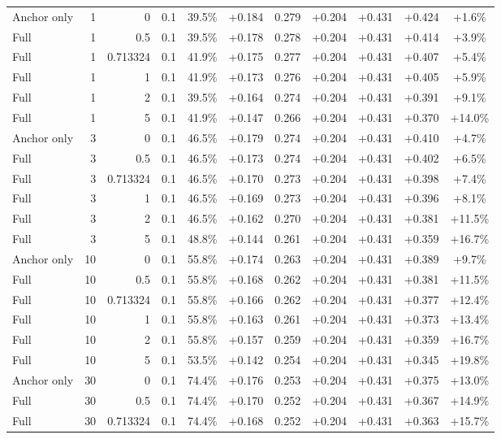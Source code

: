 \begin{table}[htbp]
\begin{tabular}{lrrrccccccc}
Anchor only & 1 & 0 & 0.1 & 39.5\% & +0.184 & 0.279 & +0.204 & +0.431 & +0.424 & +1.6\% \\
Full & 1 & 0.5 & 0.1 & 39.5\% & +0.178 & 0.278 & +0.204 & +0.431 & +0.414 & +3.9\% \\
Full & 1 & 0.713324 & 0.1 & 41.9\% & +0.175 & 0.277 & +0.204 & +0.431 & +0.407 & +5.4\% \\
Full & 1 & 1 & 0.1 & 41.9\% & +0.173 & 0.276 & +0.204 & +0.431 & +0.405 & +5.9\% \\
Full & 1 & 2 & 0.1 & 39.5\% & +0.164 & 0.274 & +0.204 & +0.431 & +0.391 & +9.1\% \\
Full & 1 & 5 & 0.1 & 41.9\% & +0.147 & 0.266 & +0.204 & +0.431 & +0.370 & +14.0\% \\
Anchor only & 3 & 0 & 0.1 & 46.5\% & +0.179 & 0.274 & +0.204 & +0.431 & +0.410 & +4.7\% \\
Full & 3 & 0.5 & 0.1 & 46.5\% & +0.173 & 0.274 & +0.204 & +0.431 & +0.402 & +6.5\% \\
Full & 3 & 0.713324 & 0.1 & 46.5\% & +0.170 & 0.273 & +0.204 & +0.431 & +0.398 & +7.4\% \\
Full & 3 & 1 & 0.1 & 46.5\% & +0.169 & 0.273 & +0.204 & +0.431 & +0.396 & +8.1\% \\
Full & 3 & 2 & 0.1 & 46.5\% & +0.162 & 0.270 & +0.204 & +0.431 & +0.381 & +11.5\% \\
Full & 3 & 5 & 0.1 & 48.8\% & +0.144 & 0.261 & +0.204 & +0.431 & +0.359 & +16.7\% \\
Anchor only & 10 & 0 & 0.1 & 55.8\% & +0.174 & 0.263 & +0.204 & +0.431 & +0.389 & +9.7\% \\
Full & 10 & 0.5 & 0.1 & 55.8\% & +0.168 & 0.262 & +0.204 & +0.431 & +0.381 & +11.5\% \\
Full & 10 & 0.713324 & 0.1 & 55.8\% & +0.166 & 0.262 & +0.204 & +0.431 & +0.377 & +12.4\% \\
Full & 10 & 1 & 0.1 & 55.8\% & +0.163 & 0.261 & +0.204 & +0.431 & +0.373 & +13.4\% \\
Full & 10 & 2 & 0.1 & 55.8\% & +0.157 & 0.259 & +0.204 & +0.431 & +0.359 & +16.7\% \\
Full & 10 & 5 & 0.1 & 53.5\% & +0.142 & 0.254 & +0.204 & +0.431 & +0.345 & +19.8\% \\
Anchor only & 30 & 0 & 0.1 & 74.4\% & +0.176 & 0.253 & +0.204 & +0.431 & +0.375 & +13.0\% \\
Full & 30 & 0.5 & 0.1 & 74.4\% & +0.170 & 0.252 & +0.204 & +0.431 & +0.367 & +14.9\% \\
Full & 30 & 0.713324 & 0.1 & 74.4\% & +0.168 & 0.252 & +0.204 & +0.431 & +0.363 & +15.7\% \\

\end{tabular}
\end{table}
